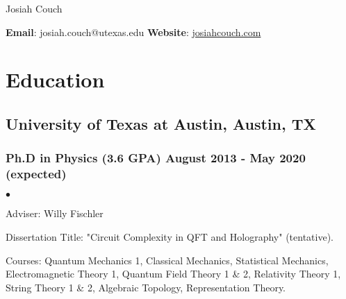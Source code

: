 \documentclass[letterpaper]{article}
\def\name{Josiah Couch}
\renewenvironment{itemize}{
  \begin{list}{$\bullet$}{
    \setlength{\itemsep}{0em}
    \setlength{\parskip}{0em}
    \setlength{\parsep}{0em} 
    \setlength{\topsep}{0em} 
  }
}{
  \end{list}
}
\begin{document}

\centerline{\LARGE \name}

\begin{center}

\small{\textbf{Email}: josiah.couch@utexas.edu \textbf{Website}: \url{josiahcouch.com}}

\end{center}

\section*{Education}

\subsection*{University of Texas at Austin, Austin, TX}
\subsubsection*{Ph.D in Physics (3.6 GPA) \hfill August 2013 - May 2020 (expected)}

\begin{itemize}
\item Adviser: Willy Fischler
\item Dissertation Title: "Circuit Complexity in QFT and Holography" (tentative).

\item Courses: Quantum Mechanics 1, Classical Mechanics, Statistical Mechanics, Electromagnetic Theory 1, Quantum Field Theory 1 \& 2, Relativity Theory 1, String Theory 1 \& 2, Algebraic Topology, Representation Theory.
\end{itemize}


\end{document}
